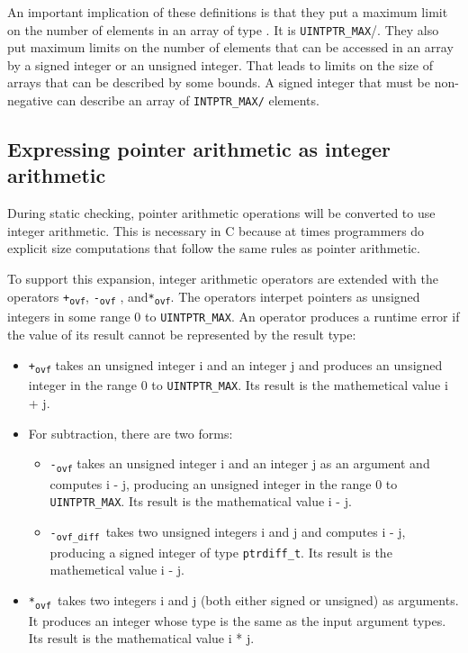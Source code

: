 An important implication of these definitions is that they put a maximum
limit on the number of elements in an array of type . It is
\texttt{UINTPTR\_MAX}/. They also put
maximum limits on the number of elements that can be accessed in an
array by a signed integer or an unsigned integer. That leads to limits
on the size of arrays that can be described by some bounds. A signed
integer that must be non-negative can describe an array of
\texttt{INTPTR\_MAX/} elements.

\subsection{Expressing pointer arithmetic as integer arithmetic}
\label{section:pointers-as-integers}

During static checking, pointer arithmetic operations will be converted
to use integer arithmetic. This is necessary in C because at times
programmers do explicit size computations that follow the same rules as
pointer arithmetic.

To support this expansion, integer arithmetic operators are extended
with the operators \texttt{+\textsubscript{ovf}},
\texttt{-\textsubscript{ovf}} , and\texttt{*\textsubscript{ovf}}. The
operators interpet pointers as unsigned integers in some range 0 to
\texttt{UINTPTR\_MAX}. An operator produces a runtime error if the value
of its result cannot be represented by the result type:

\begin{itemize}
\item
  \texttt{+\textsubscript{ovf}} takes an unsigned integer i and an
  integer j and produces an unsigned integer in the range 0 to
  \texttt{UINTPTR\_MAX}. Its result is the mathemetical value i + j.
\item
  For subtraction, there are two forms:

  \begin{itemize}
  \item
    \texttt{-\textsubscript{ovf}} takes an unsigned integer i and an
    integer j as an argument and computes i - j, producing an unsigned
    integer in the range 0 to \texttt{UINTPTR\_MAX}. Its result is the
    mathematical value i - j.
  \item
    \texttt{-\textsubscript{ovf\_diff }}takes two unsigned integers i
    and j and computes i - j, producing a signed integer of type
    \texttt{ptrdiff\_t}. Its result is the mathemetical value i - j.
  \end{itemize}
\item
  \texttt{*\textsubscript{ovf }}takes two integers i and j (both either
  signed or unsigned) as arguments. It produces an integer whose type is
  the same as the input argument types. Its result is the mathematical
  value i * j.
\end{itemize}

